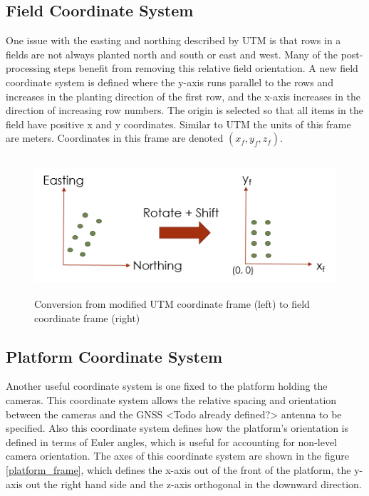 \subsection{Field Coordinate System}

One issue with the easting and northing described by UTM is that rows in a fields are not always planted north and south or east and west.  Many of the post-processing steps benefit from removing this relative field orientation. A new field coordinate system is defined where the y-axis runs parallel to the rows and increases in the planting direction of the first row, and the x-axis increases in the direction of increasing row numbers.  The origin is selected so that all items in the field have positive x and y coordinates.   Similar to UTM the units of this frame are meters.  Coordinates in this frame are denoted $(x_f,y_f,z_f)$.

\begin{figure}[tbh]
	\centering
    \includegraphics[height=2in]{figures/field_coordinates_small.png}
    \caption[Field coordinates]{Conversion from modified UTM coordinate frame (left) to field coordinate frame (right)}
    \label{field_coordinates}
\end{figure}

\subsection{Platform Coordinate System}
\label{platform_coordinate_system}

Another useful coordinate system is one fixed to the platform holding the cameras.  This coordinate system allows the relative spacing and orientation between the cameras and the GNSS <Todo already defined?> antenna to be specified.  Also this coordinate system defines how the platform's orientation is defined in terms of Euler angles, which is useful for accounting for non-level camera orientation.  The axes of this coordinate system are shown in the figure \ref{platform_frame}, which defines the x-axis out of the front of the platform, the y-axis out the right hand side and the z-axis orthogonal in the downward direction.  

